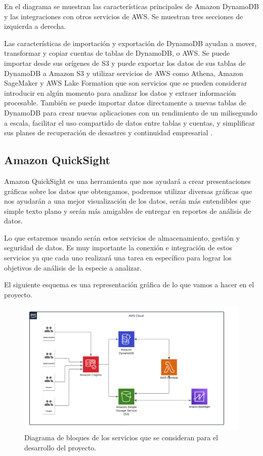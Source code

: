 En el diagrama se muestran las características principales de Amazon DynamoDB y las integraciones con otros servicios de AWS. Se muestran tres secciones de izquierda a derecha.

Las características de importación y exportación de DynamoDB ayudan a mover, transformar y copiar cuentas de tablas de DynamoDB, o AWS. Se puede importar desde sus orígenes de S3 y puede exportar los datos de sus tablas de DynamoDB a Amazon S3 y utilizar servicios de AWS como Athena, Amazon SageMaker y AWS Lake Formation que son servicios que se pueden considerar introducir en algún momento para analizar los datos y extraer información procesable. También se puede importar datos directamente a nuevas tablas de DynamoDB para crear nuevas aplicaciones con un rendimiento de un milisegundo a escala, facilitar el uso compartido de datos entre tablas y cuentas, y simplificar sus planes de recuperación de desastres y continuidad empresarial \cite{133}.

\subsection{Amazon QuickSight}
Amazon QuickSight es una herramienta que nos ayudará a crear presentaciones gráficas sobre los datos que obtengamos, podremos utilizar diversas gráficas que nos ayudarán a una mejor visualización de los datos, serán más entendibles que simple texto plano y serán más amigables de entregar en reportes de análisis de datos.

Lo que estaremos usando serán estos servicios de almacenamiento, gestión y seguridad de datos. Es muy importante la conexión e integración de estos servicios ya que cada uno realizará una tarea en específico para lograr los objetivos de análisis de la especie a analizar.

El siguiente esquema es una representación gráfica de lo que vamos a hacer en el proyecto.

\begin{figure}[h]
\centering
\includegraphics[width=\textwidth]{imagenes/diagrama.png}
\caption{Diagrama de bloques de los servicios que se consideran para el desarrollo del proyecto.}
\end{figure}


